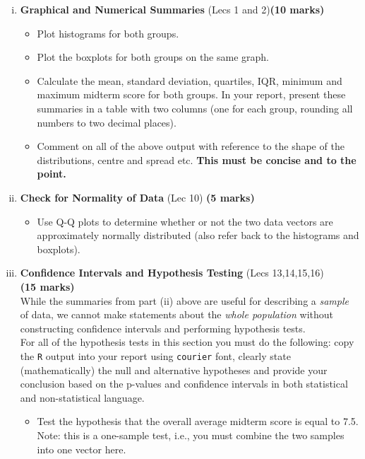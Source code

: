 \documentclass[12pt]{article}
\begin{document}
\begin{enumerate}[1)]
\begin{enumerate}[i)]
\begin{itemize}
\end{itemize}
\item {\bf Graphical and Numerical Summaries} (Lecs 1 and 2)\hfill{\scriptsize \bf (10 marks)}
\begin{itemize}
\item Plot histograms for both groups.
\item Plot the boxplots for both groups on the same graph.
\item Calculate the mean, standard deviation, quartiles, IQR, minimum and maximum midterm score for both groups. In your report, present these summaries in a table with two columns (one for each group, rounding all numbers to two decimal places).
\item Comment on all of the above output with reference to the shape of the distributions, centre and spread etc. {\bf This must be concise and to the point.}
\end{itemize}
\item {\bf Check for Normality of Data} (Lec 10) \hfill{\scriptsize \bf (5 marks)}
\begin{itemize}
\item Use Q-Q plots to determine whether or not the two data vectors are approximately normally distributed (also refer back to the histograms and boxplots).
\end{itemize}
\item {\bf Confidence Intervals and Hypothesis Testing} (Lecs 13,14,15,16)\\\phantom{a} \hfill{\scriptsize \bf (15 marks)}\\
While the summaries from part (ii) above are useful for describing a \emph{sample} of data, we cannot make statements about the \emph{whole population} without constructing confidence intervals and performing hypothesis tests.\\[0.3cm]For all of the hypothesis tests in this section you must do the following: copy the \texttt{R} output into your report using \texttt{courier} font, clearly state (mathematically) the null and alternative hypotheses and provide your conclusion based on the p-values and confidence intervals in both statistical and non-statistical language.
\begin{itemize}
\item Test the hypothesis that the overall average midterm score is equal to 7.5. Note: this is a one-sample test, i.e., you must combine the two samples into one vector here.

\end{itemize}
\end{enumerate}
\end{enumerate}
\end{document}
